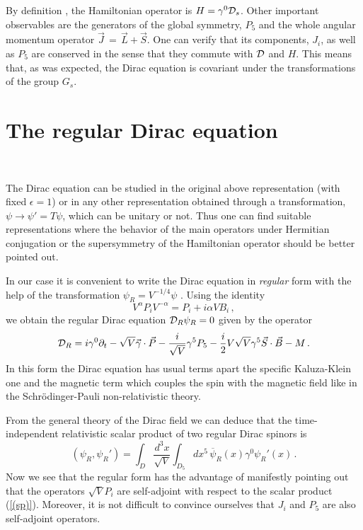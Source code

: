 \documentclass[a4paper,12pt]{article}
\begin{document}
By definition \cite{TH}, the Hamiltonian operator is 
$H=\gamma^{0}{\cal D}_{s}$. 
Other important observables are the generators 
of the global symmetry, $P_{5}$ and the  whole angular momentum operator 
$\vec{J}\,=\,\vec{L}+\vec{S}$. One can verify that its components, $J_{i}$, 
as well as $P_{5}$ are conserved in the sense that they commute with 
${\cal D}$ and $H$. This means that, as was expected, the Dirac equation is 
covariant under the transformations of the group $G_{s}$.  

\section{The regular Dirac equation}
\

The Dirac equation can be studied in the original above representation 
(with fixed $\epsilon=1$) or 
in any other representation obtained through a transformation, $\psi\to \psi'=
T\psi$, which can be unitary or not. Thus one can find suitable representations 
where the  behavior of the main operators under Hermitian conjugation or the 
supersymmetry of the Hamiltonian operator should be better pointed out. 

In our case it is convenient to write the Dirac equation in {\em regular} form 
with the help of the transformation $\psi_{R} =V^{-1/4} \psi$ \cite{DIRAC}. 
Using the identity \cite{CH}
\begin{equation}\label{idCH}
V^{\alpha}P_{i}V^{-\alpha}=P_{i}+i\alpha V B_{i}\,,
\end{equation}
we obtain the regular Dirac equation  ${\cal D}_{R}\psi_{R}=0$ given by  
the operator   
\begin{equation}\label{(rde)}
{\cal D}_{R}=i\gamma^{0}\partial_{t} - \sqrt{V}\vec{\gamma}\cdot\vec{P}
-\frac{i}{\sqrt{V}}\gamma^{5}P_{5}-
\frac{i}{2} V\sqrt{V}\gamma^{5}\vec{S}\cdot\vec{B}- M\,.
\end{equation}
In this form the Dirac equation  has usual terms apart  the specific 
Kaluza-Klein one and the magnetic term which 
couples the spin with the magnetic field like in the Schr\" odinger-Pauli 
non-relativistic theory. 

From the general theory of the Dirac field \cite{BD,DKK} 
we can deduce that the time-independent relativistic scalar product of two 
regular Dirac spinors is 
\begin{equation}\label{(sp)}
(\psi_{R},\psi_{R}')=\int_{D}\frac{d^{3}x}{\sqrt{V}}\int_{D_{5}}dx^{5}\,
\overline{\psi}_{R}(x)\gamma^{0}\psi_{R}'(x)\,. 
\end{equation}
Now we see that the regular form has the advantage of manifestly pointing out 
that the operators $\sqrt{V}P_{i}$ are 
self-adjoint with respect to the scalar product (\ref{(sp)}). Moreover, it is 
not difficult to convince ourselves that  $J_{i}$ and $P_{5}$ are also 
self-adjoint operators. 
\end{document}

